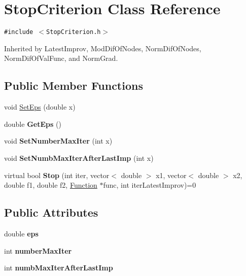 \hypertarget{class_stop_criterion}{
\section{StopCriterion Class Reference}
\label{class_stop_criterion}
}
{\tt \#include $<$StopCriterion.h$>$}

Inherited by LatestImprov, ModDifOfNodes, NormDifOfNodes, NormDifOfValFunc, and NormGrad.

\subsection*{Public Member Functions}
\begin{CompactItemize}
\item 
void \hyperlink{class_stop_criterion_4d4190f91f16897f4dba141f62f421ac}{SetEps} (double x)
\item 
\hypertarget{class_stop_criterion_7b2c88d84e4a1bf2e04b923414cfa084}{
double \textbf{GetEps} ()}
\label{class_stop_criterion_7b2c88d84e4a1bf2e04b923414cfa084}

\item 
\hypertarget{class_stop_criterion_415f032d0b6e7fd9d224e5aace00ddf6}{
void \textbf{SetNumberMaxIter} (int x)}
\label{class_stop_criterion_415f032d0b6e7fd9d224e5aace00ddf6}

\item 
\hypertarget{class_stop_criterion_b4ecd6469a833389909b83a2e90b6371}{
void \textbf{SetNumbMaxIterAfterLastImp} (int x)}
\label{class_stop_criterion_b4ecd6469a833389909b83a2e90b6371}

\item 
\hypertarget{class_stop_criterion_f268e929304b7e9cc78d89821088dc84}{
virtual bool \textbf{Stop} (int iter, vector$<$ double $>$ x1, vector$<$ double $>$ x2, double f1, double f2, \hyperlink{class_function}{Function} $\ast$func, int iterLatestImprov)=0}
\label{class_stop_criterion_f268e929304b7e9cc78d89821088dc84}

\end{CompactItemize}
\subsection*{Public Attributes}
\begin{CompactItemize}
\item 
\hypertarget{class_stop_criterion_a848cdc8c317a0788f3bc2daa9444b18}{
double \textbf{eps}}
\label{class_stop_criterion_a848cdc8c317a0788f3bc2daa9444b18}

\item 
\hypertarget{class_stop_criterion_116d585b05dfa557102d6fc3d2e1a445}{
int \textbf{numberMaxIter}}
\label{class_stop_criterion_116d585b05dfa557102d6fc3d2e1a445}

\item 
\hypertarget{class_stop_criterion_8b53203beb78987376847691df4bad34}{
int \textbf{numbMaxIterAfterLastImp}}
\label{class_stop_criterion_8b53203beb78987376847691df4bad34}

\end{CompactItemize}


